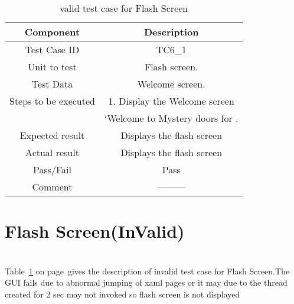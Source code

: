 \begin{table}[htb!]
\label{table : 11}
\centering %
\begin{tabular}{c c} %
\hline\hline %
 Component & Description \\ [0.5ex] %
\hline %
Test Case ID & TC6\_1   \\
Unit to test &Flash screen. \\ 
Test Data &Welcome screen.\\
Steps to be executed &1. Display the Welcome screen\\
& ‘Welcome to Mystery doors for .\\



Expected result  &Displays the flash screen\\ 
Actual result &Displays the flash screen\\
Pass/Fail &Pass\\
Comment &---------\\


\hline %
\end{tabular}
\caption{valid test case for Flash Screen} \label{table:tc11} %
\end{table}

\section{Flash Screen(InValid)}
\hspace{1cm} \\
Table~\ref{table:tc11} on
page~\pageref{table:tc11}gives the description of invalid test case for Flash Screen.The GUI fails due to abnormal jumping of xaml pages  or it may due to the thread created for 2 sec may not invoked so flash screen is not displayed\\

